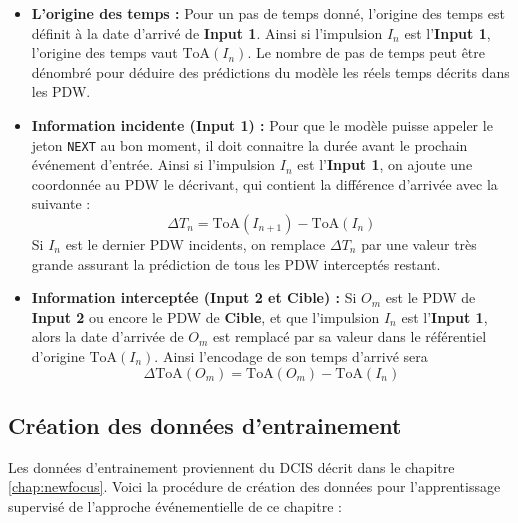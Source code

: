 \begin{itemize}
\item \textbf{L'origine des temps :} Pour un pas de temps donné, l'origine des temps est définit à la date d'arrivé de \textbf{Input 1}. Ainsi si l'impulsion $I_n$ est l'\textbf{Input 1}, l'origine des temps vaut $\text{ToA}(I_n)$. Le nombre de pas de temps peut être dénombré pour déduire des prédictions du modèle les réels temps décrits dans les PDW.
\item \textbf{Information incidente (Input 1) :} Pour que le modèle puisse appeler le jeton \texttt{NEXT} au bon moment, il doit connaitre la durée avant le prochain événement d'entrée. Ainsi si l'impulsion $I_n$ est l'\textbf{Input 1}, on ajoute une coordonnée au PDW le décrivant, qui contient la différence d'arrivée avec la suivante : 
$$\Delta T_n = \text{ToA}(I_{n+1}) - \text{ToA}(I_n)$$
Si $I_n$ est le dernier PDW incidents, on remplace $\Delta T_n$ par une valeur très grande assurant la prédiction de tous les PDW interceptés restant.
\item \textbf{Information interceptée (Input 2 et Cible) :} Si $O_m$ est le PDW de \textbf{Input 2} ou encore le PDW de \textbf{Cible}, et que l'impulsion $I_n$ est l'\textbf{Input 1}, alors la date d'arrivée de $O_m$ est remplacé par sa valeur dans le référentiel d'origine $\text{ToA}(I_n)$. Ainsi l'encodage de son temps d'arrivé sera $$\Delta \text{ToA}(O_m) = \text{ToA}(O_m) - \text{ToA}(I_n)$$
\end{itemize}

\subsection{Création des données d'entrainement}
\label{seq:fafmask}
Les données d'entrainement proviennent du DCIS décrit dans le chapitre \ref{chap:newfocus}. Voici la procédure de création des données pour l'apprentissage supervisé de l'approche événementielle de ce chapitre :

